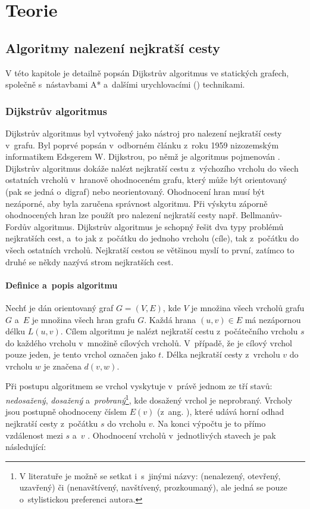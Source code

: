 \part{Teorie}
\chapter{Algoritmy nalezení nejkratší cesty}
\label{ch:algos}
V této kapitole je detailně popsán Dijkstrův algoritmus ve statických grafech, společně s~nástavbami A* a~dalšími urychlovacími () technikami.

\section{Dijkstrův algoritmus}
Dijkstrův algoritmus byl vytvořený jako nástroj pro nalezení nejkratší cesty v~grafu. Byl poprvé popsán v~odborném článku z~roku 1959 nizozemským informatikem Edsgerem W. Dijkstrou, po němž je algoritmus pojmenován \cite{Dijkstra59}. Dijkstrův algoritmus dokáže nalézt nejkratší cestu z~výchozího vrcholu do všech ostatních vrcholů v~hranově ohodnoceném grafu, který může být orientovaný (pak se jedná o~digraf) nebo neorientovaný. Ohodnocení hran musí být nezáporné, aby byla zaručena správnost algoritmu. Při výskytu záporně ohodnocených hran lze použít pro nalezení nejkratší cesty např. Bellmanův-Fordův algoritmus. Dijkstrův algoritmus je schopný řešit dva typy problémů nejkratších cest, a~to jak z~počátku do jednoho vrcholu (cíle), tak z~počátku do všech ostatních vrcholů. Nejkratší cestou se většinou myslí to první, zatímco to druhé se někdy nazývá strom nejkratších cest.

\subsection{Definice a~popis algoritmu}
Nechť je dán orientovaný graf $G = (V, E)$, kde $V$ je množina všech vrcholů grafu $G$ a~$E$ je množina všech hran grafu $G$. Každá hrana $(u,v) \in E$ má nezápornou délku $L(u,v)$. Cílem algoritmu je nalézt nejkratší cestu z~počátečního vrcholu $s$ do každého vrcholu v~množině cílových vrcholů. V~případě, že je cílový vrchol pouze jeden, je tento vrchol označen jako $t$. Délka nejkratší cesty z~vrcholu $v$ do vrcholu $w$ je značena $d(v,w)$.

Při postupu algoritmem se vrchol vyskytuje v~právě jednom ze tří stavů: \textit{nedosažený}, \textit{dosažený} a~\textit{probraný}\footnote{V literatuře je možně se setkat i~s~jinými názvy: (nenalezený, otevřený, uzavřený) či (nenavštívený, navštívený, prozkoumaný), ale jedná se pouze o~stylistickou preferenci autora.}, kde dosažený vrchol je neprobraný. Vrcholy jsou postupně ohodnoceny číslem $E(v)$ (z~ang. ), které udává horní odhad nejkratší cesty z~počátku $s$ do vrcholu $v$. Na konci výpočtu je to přímo vzdálenost mezi $s$ a~$v$ \cite{mffDijkstraKucera}. Ohodnocení vrcholů v~jednotlivých stavech je pak následující:

